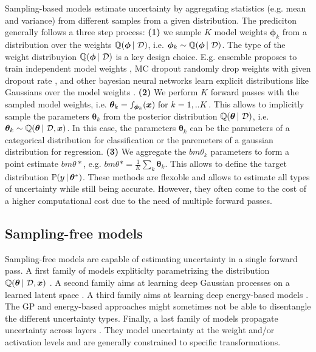 Sampling-based models estimate uncertainty by aggregating statistics (e.g. mean and variance) from different samples from a given distribution. The prediciton generally follows a three step process:
\textbf{(1)} we sample $K$ model weights $\bm{\phi}_k$ from a distribution over the weights $\operatorname{\mathbb{Q}}(\bm{\phi} \,|\, \operatorname{\mathcal{D}})$, i.e. $\bm{\phi}_k \sim \operatorname{\mathbb{Q}}(\bm{\phi} \,|\, \operatorname{\mathcal{D}})$. The type of the weight distribuyion $\operatorname{\mathbb{Q}}(\bm{\phi} \,|\, \operatorname{\mathcal{D}})$ is a key design choice. E.g. ensemble proposes to train independent model weights \cite{ensembles}, MC dropout randomly drop weights with given dropout rate \cite{dropout}, and other bayesian neural networks learn explicit distributions like Gaussians over the model weights \cite{bayesian-networks}. \textbf{(2)} We perform $K$ forward passes with the sampled model weights, i.e. $\bm{\theta}_k = f_{\bm{\phi}_k}(\bm{x}) \text{ for } k=1,..K$. This allows to implicitly sample the parameters $\bm{\theta}_k$ from the posterior distribution $\operatorname{\mathbb{Q}}(\bm{\theta} \,|\, \operatorname{\mathcal{D}})$, i.e. $\bm{\theta}_k \sim \operatorname{\mathbb{Q}}(\bm{\theta} \,|\, \operatorname{\mathcal{D}}, \bm{x})$. In this case, the parameters $\bm{\theta}_k$ can be the parameters of a categorical distribution for classification or the paremeters of a gaussian distribution for regression. \textbf{(3)} We aggregate the $bm{\theta}_k$ parameters to form a point estimate $bm{\theta}*$, e.g. $bm{\theta}*=\frac{1}{K}\sum_k \bm{\theta}_k$. This allows to define the target distribution $\mathbb{P}(y \,|\, \bm{\theta}^*)$. These methods are flexoble and allows to estimate all types of uncertainty while still being accurate. However, they often come to the cost of a higher computational cost due to the need of multiple forward passes.

\subsection{Sampling-free models}
Sampling-free models are capable of estimating uncertainty in a single forward pass. A first family of models expliticlty parametrizing the distribution $\operatorname{\mathbb{Q}}(\bm{\theta} \,|\, \operatorname{\mathcal{D}}, \bm{x})$ \citep{survey_evidential_uncertainty,robustness-uncertainty-dirichlet,max_gap_id_ood,uncertainty-generative-classifier,multifaceted_uncertainty,graph-postnet, lightweight-prob-net}. A second family aims at learning deep Gaussian processes on a learned latent space \citep{uncertainty-distance-awareness, due, duq, uceloss}. A third family aims at learning deep energy-based models \citep{ood_ebm, jem_ebm}. The GP and energy-based approaches might sometimes not be able to disentangle the different uncertainty types. Finally, a last family of models propagate uncertainty across layers \citep{natural-parameter-network, sampling-free-variance-propagation, feed-forward-propagation, lightweight-prob-net, probabilistic-backprop-scalable-bnn}. They model uncertainty at the weight and/or activation levels and are generally constrained to specific transformations.

